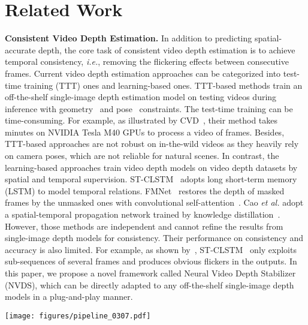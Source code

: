 \documentclass[10pt,twocolumn,letterpaper]{article}
\def\framework{Neural Video Depth Stabilizer}
\def\sx{NVDS}
\def\sbn{stabilization network}
\begin{document}
\section{Related Work}


\noindent\textbf{Consistent Video Depth Estimation.} In addition to predicting spatial-accurate depth, the core task of consistent video depth estimation is to achieve temporal consistency, \textit{i.e.}, removing the flickering effects between consecutive frames. Current video depth estimation approaches can be categorized into test-time training (TTT) ones and learning-based ones.
TTT-based methods train an off-the-shelf single-image depth estimation model on testing videos during inference with geometry~\cite{CVD,rcvd,dycvd} and pose~\cite{colmapmvs,colmapsfm,rcvd} constraints. The test-time training can be time-consuming. For example, as illustrated by CVD~\cite{CVD}, their method takes  minutes on  NVIDIA Tesla M40 GPUs to process a video of  frames. Besides, TTT-based approaches are not robust on in-the-wild videos as they heavily rely on camera poses, which are not reliable for natural scenes.
In contrast, the learning-based approaches train video depth models on video depth datasets by spatial and temporal supervision. ST-CLSTM~\cite{ST-CLSTM} adopts long short-term memory (LSTM) to model temporal relations. FMNet~\cite{fmnet} restores the depth of masked frames by the unmasked ones with convolutional self-attention~\cite{ctrans}. Cao \textit{et al.} adopt a spatial-temporal propagation
network trained by knowledge distillation~\cite{kd0,kd1}. However, those methods are independent and cannot refine the results from single-image depth models for consistency. Their performance on consistency and accuracy is also limited. For example, as shown by~\cite{fmnet}, ST-CLSTM~\cite{stt} only exploits sub-sequences of several frames and produces obvious flickers in the outputs. In this paper, we propose a novel framework called \framework{} (\sx{}), which can be directly adapted to any off-the-shelf single-image depth models in a plug-and-play manner. 

\begin{figure*}[!t]
\centering
\texttt{[image: figures/pipeline\_0307.pdf]}
\vspace{-10pt}
\caption{
\textbf{Overview of the neural video depth stabilizer.}
Our framework consists of a depth predictor and a \sbn{}. The depth predictor can be any single-image depth model which produces initial flickering disparity maps. Then, the \sbn{} refines the flickering disparity maps into temporally consistent ones. The \sbn{} functions in a sliding window manner: the frame to be predicted fetches information from adjacent frames for stabilization.
During inference, our \sx{} framework can be directly adapted to any off-the-shelf depth predictors in a plug-and-play manner. We also devise bidirectional inference to further improve consistency.}
\label{fig:pipeline}
\end{figure*}
\end{document}
